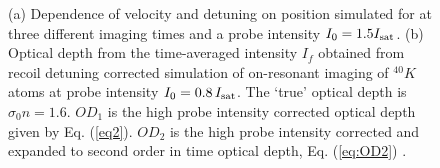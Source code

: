 \documentclass[12pt]{iopart}
\begin{document}
\begin{figure}
\caption{(a) Dependence of velocity and detuning on position simulated for \K{} at three different imaging times and a probe intensity $I_0=1.5 I_{\rm{sat}}$. (b) Optical depth from the time-averaged intensity $I_f$ obtained from recoil detuning corrected simulation of on-resonant imaging of $^{40}K$ atoms at probe intensity $I_0=0.8\, I_{\rm{sat}}$. The `true' optical depth is $\sigma_0 n=1.6$. $OD_1$ is the high probe intensity corrected optical depth given by Eq. (\ref{eq2}). $OD_2$ is the high probe intensity corrected and expanded to second order in time optical depth, Eq. (\ref{eq:OD2}) \cite{LJLthesis}.}  
\label{fig:expos}
\end{figure}
\end{document}

